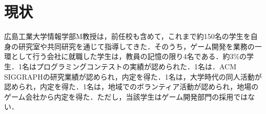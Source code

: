 \section{現状}

広島工業大学情報学部M教授は，前任校も含めて，これまで約150名の学生を自身の研究室や共同研究を通じて指導してきた．そのうち，ゲーム開発を業務の一環として行う会社に就職した学生は，教員の記憶の限り4名である．約3\%の学生．1名はプログラミングコンテストの実績が認められた．1名は．ACM SIGGRAPHの研究業績が認められ，内定を得た．1名は，大学時代の同人活動が認められ，内定を得た．1名は，地域でのボランティア活動が認められ，地場のゲーム会社から内定を得た．ただし，当該学生はゲーム開発部門の採用ではない．